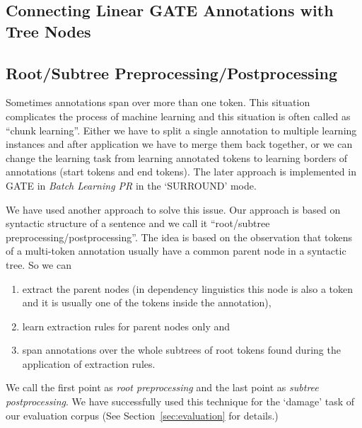 \subsection{Connecting Linear GATE Annotations with Tree Nodes}


\subsection{Root/Subtree Preprocessing/Postprocessing}
Sometimes annotations span over more than one token. This situation complicates the process of machine learning and this situation is often called as ``chunk learning''. Either we have to split a single annotation to multiple learning instances and after application we have to merge them back together, or we can change the learning task from learning annotated tokens to learning borders of annotations (start tokens and end tokens). The later approach is implemented in GATE in \emph{Batch Learning PR} in the `SURROUND' mode.

We have used another approach to solve this issue. Our approach is based on syntactic structure of a sentence and we call it ``root/subtree preprocessing/postprocessing''. The idea is based on the observation that tokens of a multi-token annotation usually have a common parent node in a syntactic tree. So we can
\begin{enumerate}
	\item extract the parent nodes (in dependency linguistics this node is also a token and it is usually one of the tokens inside the annotation), 
	\item learn extraction rules for parent nodes only and 
	\item span annotations over the whole subtrees of root tokens found during the application of extraction rules.
\end{enumerate}
We call the first point as \emph{root preprocessing} and the last point as \emph{subtree postprocessing}. We have successfully used this technique for the `damage' task of our evaluation corpus (See Section~\ref{sec:evaluation} for details.)

